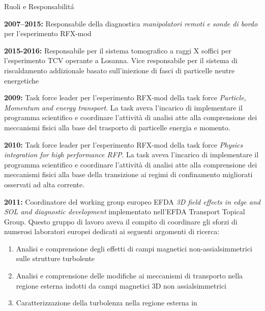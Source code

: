 \begin{statementblock}{Ruoli e Responsabilit{\'a}}
\end{statementblock}


\begin{enumerate}[label={[E\arabic*]}]

\item \textbf{2007--2015:} Responsabile della diagnostica
  \emph{manipolatori remoti e sonde di bordo} per l'esperimento
  RFX-mod
%
\item \textbf{2015-2016:} Responsabile per il sistema tomografico a
  raggi X soffici per l'esperimento TCV operante a Losanna. Vice
  responsabile per il sistema di riscaldamento addizionale basato
  sull'iniezione di fasci di particelle neutre energetiche
%
\item \textbf{2009:} Task force leader per l'esperimento RFX-mod della
  task force \emph{Particle, Momentum and energy transport}. La task
  aveva l'incarico di implementare il programma scientifico e
  coordinare l'attivit{\`a} di analisi atte alla comprensione dei
  meccanismi fisici alla base del trasporto di particelle energia e
  momento.
%
\item \textbf{2010:} Task force leader per l'esperimento RFX-mod della
  task force \emph{Physics integration for high performance RFP}. La
  task aveva l'incarico di implementare il programma scientifico e
  coordinare l'attivit{\`a} di analisi atte alla comprensione dei
  meccanismi fisici alla base della transizione ai regimi di
  confinamento migliorati osservati ad alta corrente.
%
\item \textbf{2011:} Coordinatore del working group europeo EFDA
  \emph{3D field effects in edge and SOL and diagnostic development}
  implementato nell'EFDA Transport Topical Group. Questo gruppo di
  lavoro aveva il compito di coordinare gli sforzi di numerosi
  laboratori europei dedicati ai seguenti argomenti di ricerca:
  \begin{enumerate}[noitemsep,leftmargin=*,topsep=0pt,partopsep=0pt]
  \item Analisi e comprensione degli effetti di campi magnetici
    non-assialsimmetrici sulle strutture turbolente
  \item Analisi e comprensione delle modifiche ai meccanismi di
    transporto nella regione esterna indotti da campi magnetici 3D non
    assialsimmetrici
  \item Caratterizzazione della turbolenza nella regione esterna in

\end{enumerate}
\end{enumerate}
